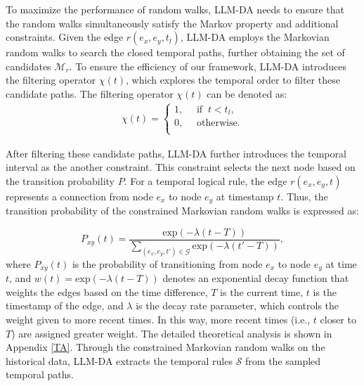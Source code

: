 \documentclass{article}
\begin{document}
To maximize the performance of random walks, LLM-DA needs to ensure that the random walks simultaneously satisfy the Markov property and additional constraints. 
Given the edge $r(e_x, e_y, t_l)$, LLM-DA employs the Markovian random walks to search the closed temporal paths, further obtaining the set of candidates $\mathcal{M}_{{r}}$. To ensure the efficiency of our framework, LLM-DA introduces the filtering operator $\chi(t)$, which explores the temporal order to filter these candidate paths. The filtering operator $\chi(t)$ can be denoted as:
\begin{equation}
\begin{aligned}
    \chi(t)=\left\{
                \begin{array}{ll}
                  1,\quad \text{ if } \ t < t_l,\\
                  0,\quad \text{ otherwise.}\\
                \end{array}
              \right.
\end{aligned}
\label{fliter}
\end{equation}

After filtering these candidate paths, LLM-DA further introduces the temporal interval as the another constraint. This constraint selects the next node based on the transition probability $P$.
For a temporal logical rule, the edge $r(e_x,e_y,t)$ represents a connection from node $e_x$ to node $e_y$ at timestamp $t$. Thus, the transition probability of the constrained Markovian random walks is expressed as:

\begin{equation}
    P_{xy}(t)=\frac{\text{exp}(-\lambda(t-T))}{\sum_{(e_x,e_y,t')\in \mathcal{G}}\text{exp}(-\lambda(t'-T))},
    \label{probability}
\end{equation}
where $P_{xy}(t)$ is the probability of transitioning from node $e_x$ to node $e_y$ at time $t$, and $w(t)=\text{exp}(-\lambda(t-T))$ denotes an exponential decay function that weights the edges based on the time difference, 
$T$ is the current time, $t$ is the timestamp of the edge, and $\lambda$ is the decay rate parameter, which controls the weight given to more recent times. In this way, more recent times (i.e., $t$ closer to $T$) are assigned greater weight. The detailed theoretical analysis is shown in Appendix \ref{TA}.
Through the constrained Markovian random walks on the historical data, LLM-DA extracts the temporal rules $\mathcal{S}$ from the sampled  temporal paths.
\end{document}
